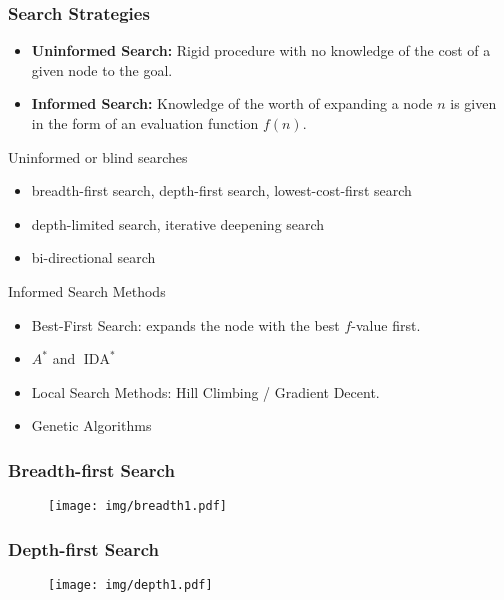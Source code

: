 \documentclass[UTF8,11pt,colorlinks,compress,openany]{beamer}%
\begin{document}
\begin{frame}\frametitle{Search Strategies}
\begin{itemize}
	\item \textbf{Uninformed Search:} Rigid procedure with no knowledge of the cost of a given node to the goal.
	\item \textbf{Informed Search:} Knowledge of the worth of expanding a node $n$ is given in the form of an evaluation function $f(n)$.
\end{itemize}
\begin{block}{Uninformed or blind searches}
\begin{itemize}
	\item breadth-first search, depth-first search, lowest-cost-first search
	\item depth-limited search, iterative deepening search
	\item bi-directional search
\end{itemize}
\end{block}
\begin{block}{Informed Search Methods}
\begin{itemize}
	\item Best-First Search: expands the node with the best $f$-value first.
	\item $A^*$ and $\operatorname{IDA}^*$
	\item Local Search Methods: Hill Climbing / Gradient Decent.
	\item Genetic Algorithms
\end{itemize}
\end{block}
\end{frame}

\begin{frame}\frametitle{Breadth-first Search}
\begin{figure}[H]
	\texttt{[image: img/breadth1.pdf]}	
\end{figure}	
\end{frame}

\begin{frame}\frametitle{Depth-first Search}
\begin{figure}[H]
	\texttt{[image: img/depth1.pdf]}	
\end{figure}	
\end{frame}
\end{document}
